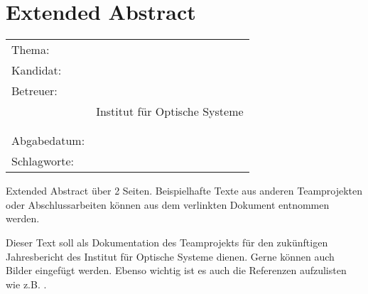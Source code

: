 \thispagestyle{plain}
\chapter*{Extended Abstract}
\label{ch:extended-abstract}

\begin{refsection}

\begin{center}
	\begin{tabular}{p{3cm}p{10cm}}
		Thema: & \thema \\[1ex]
		Kandidat: & \autor \\[1ex]
		Betreuer: & \prueferA \\
		 & Institut für Optische Systeme\\[1ex]
		 & \prueferB \\
		 & \firma \\[1ex]
		Abgabedatum: & \abgabedatum \\[1ex]
		Schlagworte: & \schlagworte \\[1ex]
	\end{tabular}
\end{center}

Extended Abstract über 2 Seiten. Beispielhafte Texte aus anderen Teamprojekten oder Abschlussarbeiten können aus dem verlinkten Dokument entnommen werden.

Dieser Text soll als Dokumentation des Teamprojekts für den zukünftigen Jahresbericht des Institut für Optische Systeme dienen. Gerne können auch Bilder eingefügt werden. Ebenso wichtig ist es auch die Referenzen aufzulisten wie z.B. \cite{rusu2011pcl}. %

\printbibliography[heading=subbibliography]

\end{refsection}
\newpage
